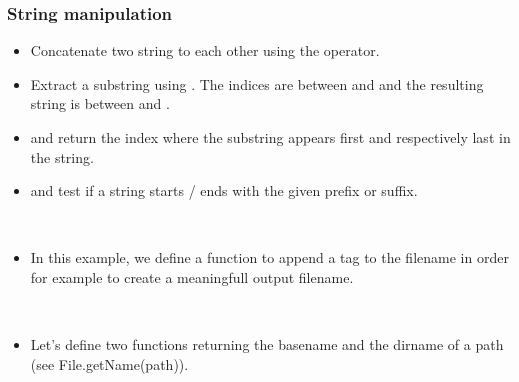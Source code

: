 \begin{frame}
  \frametitle<presentation>{String manipulation}
  \begin{itemize}
    \item Concatenate two string to each other using the \code{+} operator.
    \item Extract a substring using . The indices are between  and
       and the resulting string is between
       and .
    \item {} and
       return the index where the
      substring appears first and respectively last in the string.
    \item {} and  test if a string starts / ends with the given prefix or
      suffix.
  \end{itemize}
\end{frame}

\begin{frame}[fragile]
  \begin{example}~\par
    \begin{itemize}
    \item In this example, we define a function to append a tag to the
      filename in order for example to create a meaningfull output
      filename.~\par
      
    \end{itemize}
  \end{example}
\end{frame}

\begin{frame}[fragile]
  \begin{example}~\par
    \begin{itemize}
    \item Let's define two functions returning the basename and the
      dirname of a path (see File.getName(path)).~\par
      
    \end{itemize}
  \end{example}
\end{frame}

